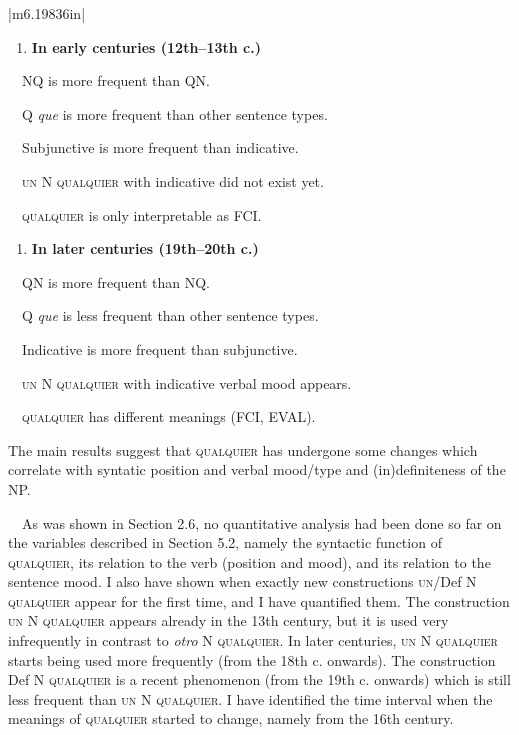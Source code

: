 \begin{flushleft}
\tablefirsthead{}
\tablehead{}
\tabletail{}
\tablelasttail{}
\begin{supertabular}{|m{6.19836in}|}
\hline
\liststyleWWNumx
\begin{enumerate}
\item {\bfseries \textmd{In early centuries (12th–13th c.) }}
\end{enumerate}
\ \ NQ is more frequent than QN.

\ \ Q \textit{que} is more frequent than other sentence types.

\ \ Subjunctive is more frequent than indicative.

\ \ \textsc{un} N \textsc{qualquier} with indicative did not exist yet.

\ \ \textsc{qualquier} is only interpretable as FCI.

\liststyleWWNumx
\setcounter{saveenum}{\value{enumi}}
\begin{enumerate}
\setcounter{enumi}{\value{saveenum}}
\item {\bfseries \textmd{In later centuries (19th–20th c.)}}
\end{enumerate}
\ \ QN is more frequent than NQ.

\ \ Q\textit{ que} is less frequent than other sentence types.

\ \ Indicative is more frequent than subjunctive.

\ \ \textsc{un} N \textsc{qualquier} with indicative verbal mood appears.

\ \ \textsc{qualquier} has different meanings (FCI, EVAL).\\\hline
\end{supertabular}
\end{flushleft}
\begin{styleStandard}
The main results suggest that \textsc{qualquier} has undergone some changes which correlate with syntatic position and verbal mood/type and (in)definiteness of the NP.
\end{styleStandard}

\begin{styleStandard}
\ \ As was shown in Section 2.6, no quantitative analysis had been done so far on the variables described in Section 5.2, namely the syntactic function of \textsc{qualquier}, its relation to the verb (position and mood), and its relation to the sentence mood. I also have shown when exactly new constructions \textsc{un}/Def N \textsc{qualquier} appear for the first time, and I have quantified them. The construction \textsc{un} N \textsc{qualquier} appears already in the 13th century, but it is used very infrequently in contrast to \textit{otro} N \textsc{qualquier}. In later centuries, \textsc{un} N \textsc{qualquier} starts being used more frequently (from the 18th c. onwards). The construction Def N \textsc{qualquier }is a recent phenomenon (from the 19th c. onwards) which is still less frequent than \textsc{un} N \textsc{qualquier. }I have identified the time interval when the meanings of \textsc{qualquier} started to change, namely from the 16th century.
\end{styleStandard}

